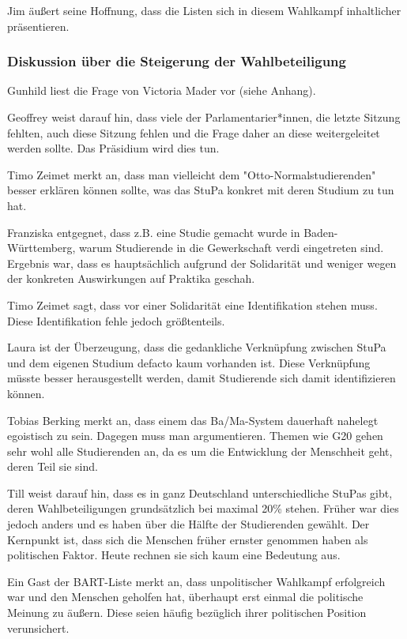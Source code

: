 \documentclass[ngerman,headheight=70pt]{scrartcl}
\begin{document}
    Jim äußert seine Hoffnung, dass die Listen sich in diesem Wahlkampf inhaltlicher
    präsentieren.

    \subsubsection{Diskussion über die Steigerung der Wahlbeteiligung}

    Gunhild liest die Frage von Victoria Mader vor (siehe Anhang).

    Geoffrey weist darauf hin, dass viele der Parlamentarier*innen, die letzte Sitzung
    fehlten, auch diese Sitzung fehlen und die Frage daher an diese weitergeleitet
    werden sollte. Das Präsidium wird dies tun.

    Timo Zeimet merkt an, dass man vielleicht dem "Otto-Normalstudierenden"
    besser erklären können sollte, was das StuPa konkret mit deren Studium zu tun
    hat.

    Franziska entgegnet, dass z.B. eine Studie gemacht wurde in Baden-Württemberg,
    warum Studierende in die Gewerkschaft verdi eingetreten sind. Ergebnis war, dass
    es hauptsächlich aufgrund der Solidarität und weniger wegen der konkreten
    Auswirkungen auf Praktika geschah.

    Timo Zeimet sagt, dass vor einer Solidarität eine Identifikation stehen muss.
    Diese Identifikation fehle jedoch größtenteils.

    Laura ist der Überzeugung, dass die gedankliche Verknüpfung zwischen StuPa
    und dem eigenen Studium defacto kaum vorhanden ist. Diese Verknüpfung müsste
    besser herausgestellt werden, damit Studierende sich damit identifizieren können.

    Tobias Berking merkt an, dass einem das Ba/Ma-System dauerhaft nahelegt
    egoistisch zu sein. Dagegen muss man argumentieren. Themen wie G20 gehen sehr
    wohl alle Studierenden an, da es um die Entwicklung der Menschheit geht, deren
    Teil sie sind.

    Till weist darauf hin, dass es in ganz Deutschland unterschiedliche StuPas gibt,
    deren Wahlbeteiligungen grundsätzlich bei maximal 20\% stehen. Früher war dies
    jedoch anders und es haben über die Hälfte der Studierenden gewählt.
    Der Kernpunkt ist, dass sich die Menschen früher ernster genommen haben als
    politischen Faktor. Heute rechnen sie sich kaum eine Bedeutung aus.

    Ein Gast der BART-Liste merkt an, dass unpolitischer Wahlkampf erfolgreich war
    und den Menschen geholfen hat, überhaupt erst einmal die politische Meinung
    zu äußern. Diese seien häufig bezüglich ihrer politischen Position verunsichert.
\end{document}
